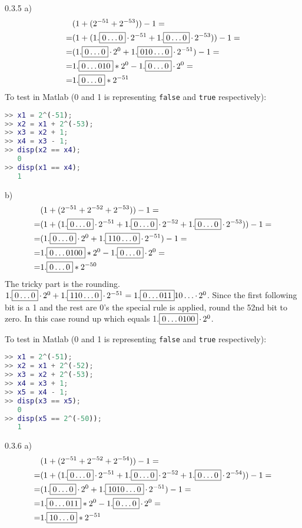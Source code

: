 \begin{task}{0.3.5 a)}
\begin{align*}
&(1+(2^{-51}+2^{-53}))-1= \\ =
&(1+(1.\boxed{0\ldots0}\operatorname{\cdot}2^{-51}+1.\boxed{0\ldots0}\operatorname{\cdot}2^{-53}))-1= \\ =
&(1.\boxed{0\ldots0}\operatorname{\cdot}2^0+1.\boxed{010\ldots0}\operatorname{\cdot}2^{-51})-1= \\ =
&1.\boxed{0\ldots010}*2^0-1.\boxed{0\ldots0}\operatorname{\cdot}2^0= \\ =
&1.\boxed{0\ldots0}*2^{-51}
\end{align*}
To test in Matlab (0 and 1 is representing \texttt{false} and \texttt{true} respectively):
\begin{lstlisting}[language=Matlab]
>> x1 = 2^(-51);
>> x2 = x1 + 2^(-53);
>> x3 = x2 + 1;
>> x4 = x3 - 1;
>> disp(x2 == x4);
   0
>> disp(x1 == x4);
   1
\end{lstlisting}
\end{task}

\begin{task}{b)}
\begin{align*}
&(1+(2^{-51}+2^{-52}+2^{-53}))-1= \\ =
&(1+(1.\boxed{0\ldots0}\operatorname{\cdot}2^{-51}+1.\boxed{0\ldots0}\operatorname{\cdot}2^{-52}+1.\boxed{0\ldots0}\operatorname{\cdot}2^{-53}))-1= \\ =
&(1.\boxed{0\ldots0}\operatorname{\cdot}2^0+1.\boxed{110\ldots0}\operatorname{\cdot}2^{-51})-1= \\ =
&1.\boxed{0\ldots0100}*2^0-1.\boxed{0\ldots0}\operatorname{\cdot}2^0= \\ =
&1.\boxed{0\ldots0}*2^{-50}
\end{align*}
The tricky part is the rounding. $1.\boxed{0\ldots0}\operatorname{\cdot}2^0+1.\boxed{110\ldots0}\operatorname{\cdot}2^{-51}=1.\boxed{0\ldots011}10\ldots\operatorname{\cdot}2^0$. Since the first following bit is a 1 and the rest are 0's the special rule is applied, round the 52nd bit to zero. In this case round up which equals 1.$\boxed{0\ldots0100}\operatorname{\cdot}2^0$.

To test in Matlab (0 and 1 is representing \texttt{false} and \texttt{true} respectively):
\begin{lstlisting}[language=Matlab]
>> x1 = 2^(-51);
>> x2 = x1 + 2^(-52);
>> x3 = x2 + 2^(-53);
>> x4 = x3 + 1;
>> x5 = x4 - 1;
>> disp(x3 == x5);
   0
>> disp(x5 == 2^(-50));
   1
\end{lstlisting}
\end{task}

\begin{task}{0.3.6 a)}
\begin{align*}
&(1+(2^{-51}+2^{-52}+2^{-54}))-1= \\ =
&(1+(1.\boxed{0\ldots0}\operatorname{\cdot}2^{-51}+1.\boxed{0\ldots0}\operatorname{\cdot}2^{-52}+1.\boxed{0\ldots0}\operatorname{\cdot}2^{-54}))-1= \\ =
&(1.\boxed{0\ldots0}\operatorname{\cdot}2^0+1.\boxed{1010\ldots0}\operatorname{\cdot}2^{-51})-1= \\ =
&1.\boxed{0\ldots011}*2^0-1.\boxed{0\ldots0}\operatorname{\cdot}2^0= \\ =
&1.\boxed{10\ldots0}*2^{-51}
\end{align*}
\end{task}

